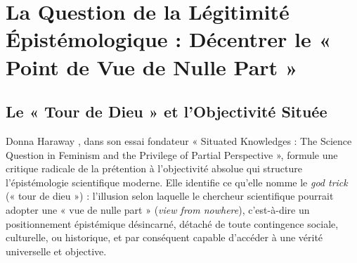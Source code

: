\documentclass[12pt,a4paper]{report}
\begin{document}
\section{La Question de la Légitimité Épistémologique : Décentrer le « Point de Vue de Nulle Part »}

\subsection{Le « Tour de Dieu » et l'Objectivité Située}

Donna Haraway \cite{Haraway1988}, dans son essai fondateur « Situated Knowledges : The Science Question in Feminism and the Privilege of Partial Perspective », formule une critique radicale de la prétention à l'objectivité absolue qui structure l'épistémologie scientifique moderne. Elle identifie ce qu'elle nomme le \textit{god trick} (« tour de dieu ») : l'illusion selon laquelle le chercheur scientifique pourrait adopter une « vue de nulle part » (\textit{view from nowhere}), c'est-à-dire un positionnement épistémique désincarné, détaché de toute contingence sociale, culturelle, ou historique, et par conséquent capable d'accéder à une vérité universelle et objective.
\end{document}
